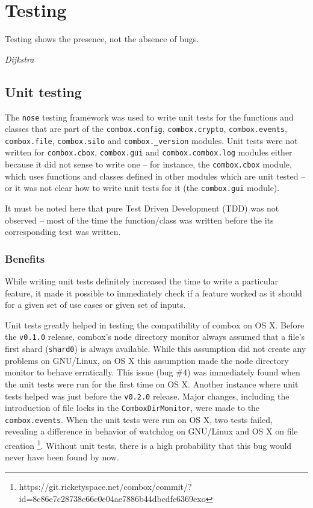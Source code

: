\chapter{Testing}\label{ch:4}

\epigraph{Testing shows the presence, not the absence of
  bugs.}{\textit{Dijkstra}\cite{dijkstra69}}

\section{Unit testing}\label{sec:4-unit-testing}

The \verb+nose+ \cite{pylib:nose} testing framework was used to write
unit tests for the functions and classes that are part of the
\verb+combox.config+, \verb+combox.crypto+, \verb+combox.events+,
\verb+combox.file+, \verb+combox.silo+ and \verb+combox._version+
modules. Unit tests were not written for \verb+combox.cbox+,
\verb+combox.gui+ and \verb+combox.combox.log+ modules either because
it did not sense to write one -- for instance, the \verb+combox.cbox+
module, which uses functions and classes defined in other modules
which are unit tested -- or it was not clear how to write unit tests
for it (the \verb+combox.gui+ module).

It must be noted here that pure Test Driven Development (TDD) was not
observed -- most of the time the function/class was written before the
its corresponding test was written.

\subsection{Benefits}

While writing unit tests definitely increased the time to write a
particular feature, it made it possible to immediately check if a
feature worked as it should for a given set of use cases or given set
of inputs.

Unit tests greatly helped in testing the compatibility of combox on OS
X. Before the \verb+v0.1.0+ release, combox's node directory monitor
always assumed that a file's first shard (\verb+shard0+) is always
available. While this assumption did not create any problems on
GNU/Linux, on OS X this assumption made the node directory monitor to
behave erratically. This issue (bug \#4) was immediately found when
the unit tests were run for the first time on OS X. Another instance
where unit tests helped was just before the \verb+v0.2.0+ release.
Major changes, including the introduction of file locks in the
\verb+ComboxDirMonitor+, were made to the \verb+combox.events+. When
the unit tests were run on OS X, two tests failed, revealing a
difference in behavior of watchdog \cite{pylib:watchdog} on GNU/Linux
and OS X on file creation
\footnote{https://git.ricketyspace.net/combox/commit/?id=8c86e7c28738c66c0e04ae7886b44dbcdfc6369exo}.
Without unit tests, there is a high probability that this bug would
never have been found by now.


